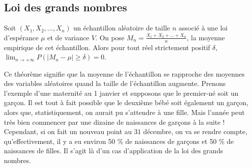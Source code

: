 	\subsection{Loi des grands nombres}
	
	\begin{formula}
		Soit $(X_1, X_2, \dots, X_n)$ un échantillon aléatoire de taille $n$ associé à une loi d'espérance $\mu$ et de variance $V$. On pose $M_n = \frac{X_1 + X_2 + \dots + X_n}{n}$, la moyenne empirique de cet échantillon.
		\newpar
		Alors pour tout réel strictement positif $\delta$, $\lim_{n \rightarrow +\infty} P(|M_n - \mu| \geq \delta) = 0$.
	\end{formula}
	
	\begin{tip}
		Ce théorème signifie que la moyenne de l'échantillon se rapproche des moyennes des variables aléatoires quand la taille de l'échantillon augmente.
		\newpar
		Prenons l'exemple d'une maternité au 1\ier{} janvier et supposons que le premier-né soit un garçon. Il est tout à fait possible que le deuxième bébé soit également un garçon, alors que, statistiquement, on aurait pu s'attendre à une fille.
		\newpar
		Mais l'année peut très bien commencer par une dizaine de naissances de garçons à la suite !
		\newpar
		Cependant, si on fait un nouveau point au $31$ décembre, on va se rendre compte, qu'effectivement, il y a eu environ 50 \% de naissances de garçons et 50 \% de naissances de filles. Il s'agit là d'un cas d'application de la loi des grands nombres.
	\end{tip}
